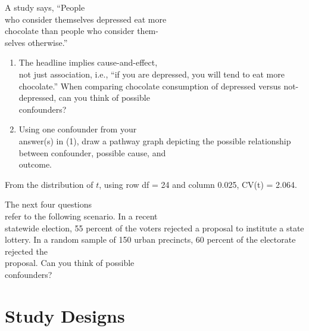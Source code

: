 \documentclass[11pt]{book}\usepackage[]{graphicx}\usepackage[]{color}
\begin{document}
\begin{exercises}
  \begin{exercise} %

A study says, ``People \\ who  consider themselves depressed eat more \\ chocolate than people who consider them- \\ selves otherwise.''

\begin{enumerate}
\item The headline implies cause-and-effect, \\ not just association, i.e., ``if you are depressed, you will tend to eat more \\ chocolate.''   When comparing chocolate consumption of depressed versus not-depressed, can you think of possible  \\ confounders?
  \item Using one confounder from your \\ answer(s) in (1), draw a pathway graph depicting the possible relationship between confounder, possible cause, and \\ outcome.
\end{enumerate}
  \end{exercise}
  \begin{solution}  %


    From the distribution of $t$, using row df = 24 and column 0.025, CV(t) = 2.064.
  \end{solution}


  \begin{exercise} %

The next four questions \\ refer to the following scenario.  In a recent \\ statewide election, 55 percent of the voters rejected a proposal to institute a state lottery.  In a random sample of 150 urban precincts, 60 percent of the electorate rejected the \\ proposal.  Can you think of possible  \\ confounders? 
  \end{exercise}


\end{exercises}
\onecolumn



\chapter{Study Designs}
\label{chap:ch5}
\end{document}
